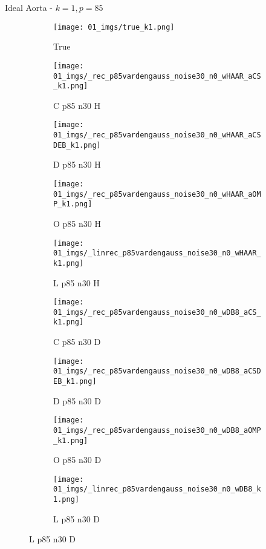 \begin{frame}{Ideal Aorta - $k=1,p=85$}{}
\begin{figure}
\begin{subfigure}{0.1\textwidth}
\texttt{[image: 01\_imgs/true\_k1.png]}
\caption*{\Tiny True}
\end{subfigure}
\begin{subfigure}{0.1\textwidth}
\texttt{[image: 01\_imgs/\_rec\_p85vardengauss\_noise30\_n0\_wHAAR\_aCS\_k1.png]}
\caption*{\Tiny C p85 n30 H}
\end{subfigure}
\begin{subfigure}{0.1\textwidth}
\texttt{[image: 01\_imgs/\_rec\_p85vardengauss\_noise30\_n0\_wHAAR\_aCSDEB\_k1.png]}
\caption*{\Tiny D p85 n30 H}
\end{subfigure}
\begin{subfigure}{0.1\textwidth}
\texttt{[image: 01\_imgs/\_rec\_p85vardengauss\_noise30\_n0\_wHAAR\_aOMP\_k1.png]}
\caption*{\Tiny O p85 n30 H}
\end{subfigure}
\begin{subfigure}{0.1\textwidth}
\texttt{[image: 01\_imgs/\_linrec\_p85vardengauss\_noise30\_n0\_wHAAR\_k1.png]}
\caption*{\Tiny L p85 n30 H}
\end{subfigure}
\begin{subfigure}{0.1\textwidth}
\texttt{[image: 01\_imgs/\_rec\_p85vardengauss\_noise30\_n0\_wDB8\_aCS\_k1.png]}
\caption*{\Tiny C p85 n30 D}
\end{subfigure}
\begin{subfigure}{0.1\textwidth}
\texttt{[image: 01\_imgs/\_rec\_p85vardengauss\_noise30\_n0\_wDB8\_aCSDEB\_k1.png]}
\caption*{\Tiny D p85 n30 D}
\end{subfigure}
\begin{subfigure}{0.1\textwidth}
\texttt{[image: 01\_imgs/\_rec\_p85vardengauss\_noise30\_n0\_wDB8\_aOMP\_k1.png]}
\caption*{\Tiny O p85 n30 D}
\end{subfigure}
\begin{subfigure}{0.1\textwidth}
\texttt{[image: 01\_imgs/\_linrec\_p85vardengauss\_noise30\_n0\_wDB8\_k1.png]}
\caption*{\Tiny L p85 n30 D}
\end{subfigure}
\end{figure}
\end{frame}

